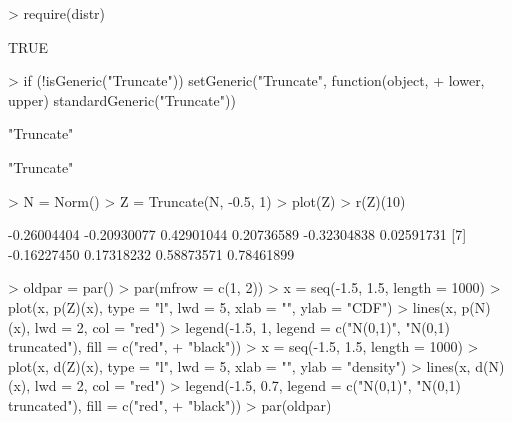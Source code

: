 \documentclass[11pt]{article}
\begin{document}
\begin{Schunk}
\begin{Sinput}
> require(distr)
\end{Sinput}
\begin{Soutput}
[1] TRUE
\end{Soutput}
\begin{Sinput}
> if (!isGeneric("Truncate")) setGeneric("Truncate", function(object, 
+     lower, upper) standardGeneric("Truncate"))
\end{Sinput}
\begin{Soutput}
[1] "Truncate"
\end{Soutput}
\begin{Soutput}
[1] "Truncate"
\end{Soutput}
\begin{Sinput}
> N = Norm()
> Z = Truncate(N, -0.5, 1)
> plot(Z)
> r(Z)(10)
\end{Sinput}
\begin{Soutput}
 [1] -0.26004404 -0.20930077  0.42901044  0.20736589 -0.32304838  0.02591731
 [7] -0.16227450  0.17318232  0.58873571  0.78461899
\end{Soutput}
\begin{Sinput}
> oldpar = par()
> par(mfrow = c(1, 2))
> x = seq(-1.5, 1.5, length = 1000)
> plot(x, p(Z)(x), type = "l", lwd = 5, xlab = "", ylab = "CDF")
> lines(x, p(N)(x), lwd = 2, col = "red")
> legend(-1.5, 1, legend = c("N(0,1)", "N(0,1) truncated"), fill = c("red", 
+     "black"))
> x = seq(-1.5, 1.5, length = 1000)
> plot(x, d(Z)(x), type = "l", lwd = 5, xlab = "", ylab = "density")
> lines(x, d(N)(x), lwd = 2, col = "red")
> legend(-1.5, 0.7, legend = c("N(0,1)", "N(0,1) truncated"), fill = c("red", 
+     "black"))
> par(oldpar)
\end{Sinput}
\end{Schunk}
\end{document}
